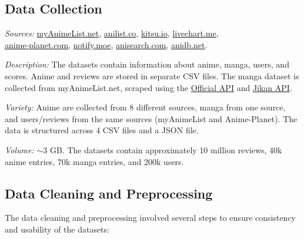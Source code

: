 \subsection{Data Collection}

\textit{Sources:}
\href{https://myanimelist.net/}{myAnimeList.net}, 
\href{https://anilist.co/}{anilist.co},
\href{https://kitsu.io/}{kitsu.io},
\href{https://livechart.me/}{livechart.me}, \\
\href{https://anime-planet.com/}{anime-planet.com},
\href{https://notify.moe/}{notify.moe},
\href{https://anisearch.com/}{anisearch.com},
\href{https://anidb.net/}{anidb.net}.

\vspace{\baselineskip}

\textit{Description:} The datasets contain information about anime, manga, users, and scores. 
Anime and reviews are stored in separate CSV files. The manga dataset is collected from myAnimeList.net, 
scraped using the \href{https://myanimelist.net/apiconfig/references/api/v2}{Official API} and \href{https://docs.api.jikan.moe/}{Jikan API}.

\vspace{\baselineskip}

\textit{Variety:} Anime are collected from 8 different sources, manga from one source, 
and users/reviews from the same sources (myAnimeList and Anime-Planet). 
The data is structured across 4 CSV files and a JSON file.

\vspace{\baselineskip}

\textit{Volume:} $\sim$3 GB\@. The datasets contain approximately 10 million reviews, 40k anime entries, 70k manga entries, 
and 200k users.

\subsection{Data Cleaning and Preprocessing}

The data cleaning and preprocessing involved several steps to ensure consistency and usability of the datasets:

